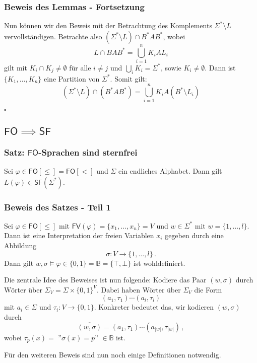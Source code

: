 \documentclass[12pt, german]{article}
\newcommand{\B}{\mathbb{B}}
\newcommand{\sigstern}{\Sigma^\ast}
\newcommand{\starfree}{\mathsf{SF}}
\newcommand{\bast}{B^{\ast}}
\newcommand{\sast}{\Sigma^{\ast}}
\newcommand{\fv}{\mathsf{FV}}
\newcommand{\fo}{\mathsf{FO}}
\newcommand{\bewiesen}{
	
	\begin{flushright}
		$\square$  \\
\end{flushright}}
\begin{document}
\subsubsection{Beweis des Lemmas - Fortsetzung}
	\label{sec:splitting_bew2}
	Nun können wir den Beweis mit der Betrachtung des Komplements $\sast\setminus L$ vervollständigen.
	Betrachte also $(\sigstern \setminus L) \cap \bast A \bast$, wobei $$L \cap BA\bast = \bigcup_{i = 1}^n K_i A L_i$$ gilt mit $K_i \cap K_j \not = \emptyset$ für alle $i \not = j$ und $\bigcup_i K_i = \sigstern$, sowie $K_i \not = \emptyset$. Dann ist $\{K_1, \ldots, K_n\}$ eine Partition von $\sigstern$. Somit gilt: $$(\sigstern \setminus L) \cap (\bast A \bast) = \bigcup_{i = 1}^nK_iA(\bast \setminus L_i)$$ 
	\bewiesen
	
\subsection{$\fo \implies \starfree$}
\subsubsection{Satz: $\fo$-Sprachen sind sternfrei}
	Sei $\varphi \in \fo[\leq] = \fo[<]$ und $\Sigma$ ein endliches Alphabet. Dann gilt $L(\varphi) \in \starfree(\sigstern)$. 

\subsubsection{Beweis des Satzes - Teil 1}
	Sei $\varphi \in \fo[\leq]$ mit $\fv(\varphi) = \{x_1, \ldots, x_n\} = V$ und $w \in \sigstern$ mit $w = \{1, \ldots, l\}$. Dann ist eine Interpretation der freien Variablen $x_i$ gegeben durch eine Abbildung $$\sigma: V \to \{1, \ldots,l\}\, .$$ 
	Dann gilt $w, \sigma \models \varphi \in \{0,1\} = \B = \{\top, \bot\}$ ist wohldefiniert. \newline
	
	Die zentrale Idee des Beweises ist nun folgende: Kodiere das Paar $(w, \sigma)$ durch Wörter über $\Sigma_V = \Sigma \times \{0,1\}^V$. Dabei haben Wörter über $\Sigma_V$ die Form $$(a_1, \tau_1) \cdots (a_l, \tau_l)$$ mit $a_i \in \Sigma$ und $\tau_i : V \to \{0,1\}$. Konkreter bedeutet das, wir kodieren $(w, \sigma)$ durch $$\overline{(w, \sigma)} = (a_1, \tau_1) \cdots (a_{|w|}, \tau_{|w|})\, ,$$ wobei $\tau_p(x) =$ ''$\sigma(x) = p$'' $\in \B$ ist.\newline
	
	Für den weiteren Beweis sind nun noch einige Definitionen notwendig. 
\end{document}
